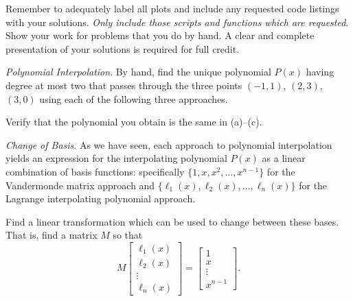 \documentclass[12pt,answers]{exam}
\begin{document}
Remember to adequately label all plots and include any requested code listings with your solutions. \emph{Only include those scripts and functions which are requested}. Show your work for problems that you do by hand. A clear and complete presentation of your solutions is required for full credit.

\begin{questions}

\question \emph{Polynomial Interpolation}. By hand, find the unique polynomial $P(x)$ having degree at most two that passes through the three points $(-1,1)$, $(2,3)$, $(3,0)$ using each of the following three approaches.


Verify that the polynomial you obtain is the same in (a)--(c).

\question \emph{Change of Basis}. As we have seen, each approach to polynomial interpolation yields an expression for the interpolating polynomial $P(x)$ as a linear combination of basis functions: specifically $\{1,x,x^2,\dots,x^{n-1}\}$ for the Vandermonde matrix approach and $\{\ell_1(x),\ell_2(x),\dots,\ell_n(x)\}$ for the Lagrange interpolating polynomial approach.

Find a linear transformation which can be used to change between these bases. That is, find a matrix $M$ so that
\[M \begin{bmatrix} \ell_1(x) \\ \ell_2(x) \\ \vdots \\ \ell_n(x) \end{bmatrix} = \begin{bmatrix} 1 \\ x \\ \vdots \\ x^{n-1} \end{bmatrix}.\]


\end{questions}
\end{document}
